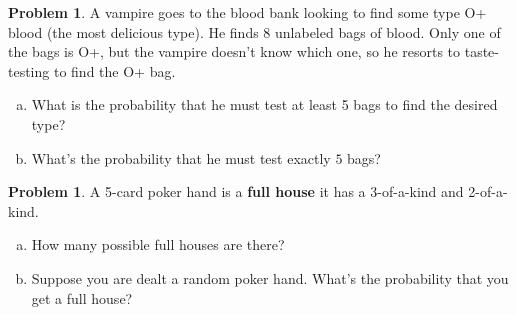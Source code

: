 \documentclass[10pt]{article}
\theoremstyle{definition}
\newtheorem{problem}[theorem]{Problem}
\newcommand{\1}[1]{\textbf{1}_{\left[#1\right]}} %
\def\P{\mathbb{P}} %
\begin{document}
\begin{problem}
  A vampire goes to the blood bank looking to find some type O+ blood (the most delicious type). He finds
  8 unlabeled bags of blood. Only one of the bags is O+, but the vampire doesn't know which one, so he
  resorts to taste-testing to find the O+ bag.
  \begin{enumerate}[(a),itemsep=0em]
    \item  What is the probability that he must test at
    least 5 bags to find the desired type?
    \item What's the probability that he must test exactly $5$ bags?
  \end{enumerate}
\end{problem}


\begin{problem}
  A 5-card poker hand is a \textbf{full house} it has a 3-of-a-kind and 2-of-a-kind.
  \begin{enumerate}[(a),itemsep=0em]
    \item How many possible full houses are there?
    \item Suppose you are dealt a random poker hand. What's the probability
    that you get a full house?
  \end{enumerate}
\end{problem}
\end{document}
